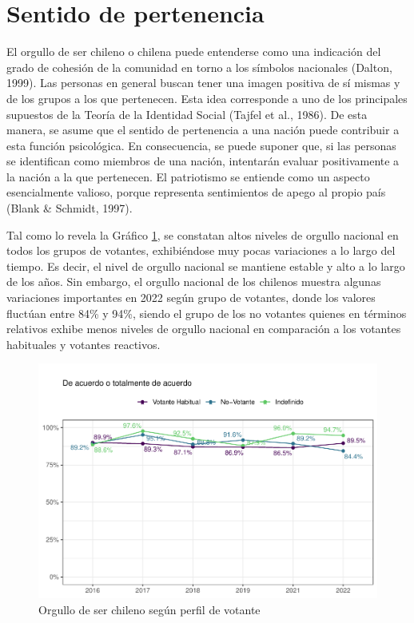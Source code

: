 \documentclass[
  12pt,
]{book}
\begin{document}
\hypertarget{sentido-de-pertenencia}{%
\section{Sentido de pertenencia}\label{sentido-de-pertenencia}}

El orgullo de ser chileno o chilena puede entenderse como una indicación del grado de cohesión de la comunidad en torno a los símbolos nacionales (Dalton, 1999). Las personas en general buscan tener una imagen positiva de sí mismas y de los grupos a los que pertenecen. Esta idea corresponde a uno de los principales supuestos de la Teoría de la Identidad Social (Tajfel et al., 1986). De esta manera, se asume que el sentido de pertenencia a una nación puede contribuir a esta función psicológica. En consecuencia, se puede suponer que, si las personas se identifican como miembros de una nación, intentarán evaluar positivamente a la nación a la que pertenecen. El patriotismo se entiende como un aspecto esencialmente valioso, porque representa sentimientos de apego al propio país (Blank \& Schmidt, 1997).

Tal como lo revela la Gráfico \ref{fig:graf-orgullochileNo-perfil}, se constatan altos niveles de orgullo nacional en todos los grupos de votantes, exhibiéndose muy pocas variaciones a lo largo del tiempo. Es decir, el nivel de orgullo nacional se mantiene estable y alto a lo largo de los años. Sin embargo, el orgullo nacional de los chilenos muestra algunas variaciones importantes en 2022 según grupo de votantes, donde los valores fluctúan entre 84\% y 94\%, siendo el grupo de los no votantes quienes en términos relativos exhibe menos niveles de orgullo nacional en comparación a los votantes habituales y votantes reactivos.

\begin{figure}

{\centering \includegraphics{reporte-elsoc_files/figure-latex/graf-orgullochileNo-perfil-1} 

}

\caption{Orgullo de ser chileno según perfil de votante}\label{fig:graf-orgullochileNo-perfil}
\end{figure}
\end{document}
